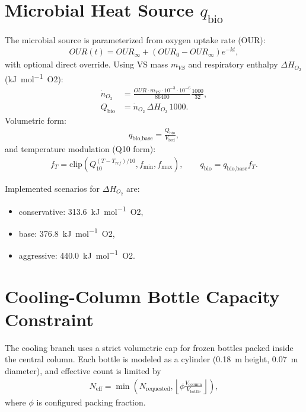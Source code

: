 \documentclass[11pt]{article}
\begin{document}
\section{Microbial Heat Source $q_{\text{bio}}$}
The microbial source is parameterized from oxygen uptake rate (OUR):
\begin{align}
OUR(t) = OUR_{\infty} + (OUR_0-OUR_{\infty})e^{-kt},
\end{align}
with optional direct override.
Using VS mass $m_{VS}$ and respiratory enthalpy $\Delta H_{O_2}$
(\si{kJ.mol^{-1}O2}):
\begin{align}
\dot n_{O_2} &= \frac{OUR\cdot m_{VS}\cdot 10^{-3}\cdot 10^{-6}}{86400}
\frac{1000}{32},
\\
Q_{\text{bio}} &= \dot n_{O_2}\,\Delta H_{O_2}\,1000.
\end{align}
Volumetric form:
\begin{align}
q_{\text{bio,base}} = \frac{Q_{\text{bio}}}{V_{\text{bed}}},
\end{align}
and temperature modulation (Q10 form):
\begin{align}
f_T = \mathrm{clip}\left(Q_{10}^{(T-T_{ref})/10},f_{\min},f_{\max}\right),
\qquad q_{\text{bio}} = q_{\text{bio,base}}f_T.
\end{align}

Implemented scenarios for $\Delta H_{O_2}$ are:
\begin{itemize}
\item conservative: \SI{313.6}{kJ.mol^{-1}O2},
\item base: \SI{376.8}{kJ.mol^{-1}O2},
\item aggressive: \SI{440.0}{kJ.mol^{-1}O2}.
\end{itemize}

\section{Cooling-Column Bottle Capacity Constraint}
The cooling branch uses a strict volumetric cap for frozen bottles packed inside the
central column. Each bottle is modeled as a cylinder
(\SI{0.18}{m} height, \SI{0.07}{m} diameter), and effective count is limited by
\begin{align}
N_{\text{eff}} = \min\left(N_{\text{requested}},
\left\lfloor \phi\frac{V_{\text{column}}}{V_{\text{bottle}}}\right\rfloor\right),
\end{align}
where $\phi$ is configured packing fraction.
\end{document}

